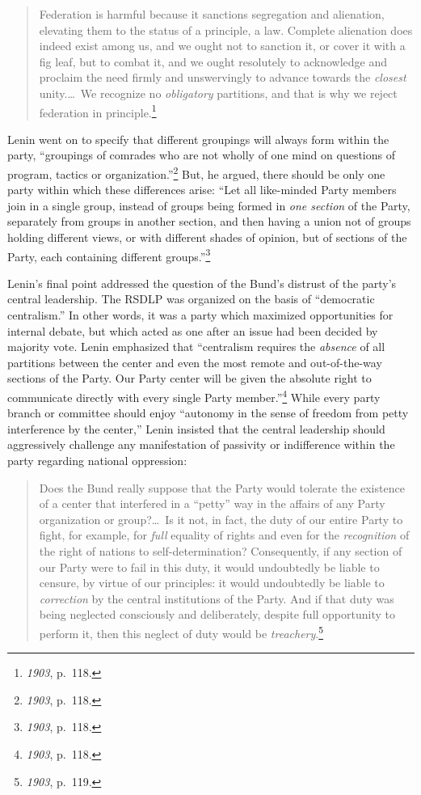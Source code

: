 \blockquote{Federation is harmful because it sanctions segregation and alienation, elevating them to the status of a principle, a law. Complete alienation does indeed exist among us, and we ought not to sanction it, or cover it with a fig leaf, but to combat it, and we ought resolutely to acknowledge and proclaim the need firmly and unswervingly to advance towards the \emph{closest} unity.\ldots\ We recognize no \emph{obligatory} partitions, and that is why we reject federation in principle.\footnote{\emph{1903}, p.\ 118.}}

Lenin went on to specify that different groupings will always form within the party, ``groupings of comrades who are not wholly of one mind on questions of program, tactics or organization.''\footnote{\emph{1903}, p.\ 118.} But, he argued, there should be only one party within which these differences arise: ``Let all like-minded Party members join in a single group, instead of groups being formed in \emph{one section} of the Party, separately from groups in another section, and then having a union not of groups holding different views, or with different shades of opinion, but of sections of the Party, each containing different groups.''\footnote{\emph{1903}, p.\ 118.}

Lenin's final point addressed the question of the Bund's distrust of the party's central leadership. The RSDLP was organized on the basis of ``democratic centralism.'' In other words, it was a party which maximized opportunities for internal debate, but which acted as one after an issue had been decided by majority vote. Lenin emphasized that ``centralism requires the \emph{absence} of all partitions between the center and even the most remote and out-of-the-way sections of the Party. Our Party center will be given the absolute right to communicate directly with every single Party member.''\footnote{\emph{1903}, p.\ 118.} While every party branch or committee should enjoy ``autonomy in the sense of freedom from petty interference by the center,'' Lenin insisted that the central leadership should aggressively challenge any manifestation of passivity or indifference within the party regarding national oppression:

\blockquote{Does the Bund really suppose that the Party would tolerate the existence of a center that interfered in a ``petty'' way in the affairs of any Party organization or group?\ldots\ Is it not, in fact, the duty of our entire Party to fight, for example, for \emph{full} equality of rights and even for the \emph{recognition} of the right of nations to self-determination? Consequently, if any section of our Party were to fail in this duty, it would undoubtedly be liable to censure, by virtue of our principles: it would undoubtedly be liable to \emph{correction} by the central institutions of the Party. And if that duty was being neglected consciously and deliberately, despite full opportunity to perform it, then this neglect of duty would be \emph{treachery}.\footnote{\emph{1903}, p.\ 119.}}

